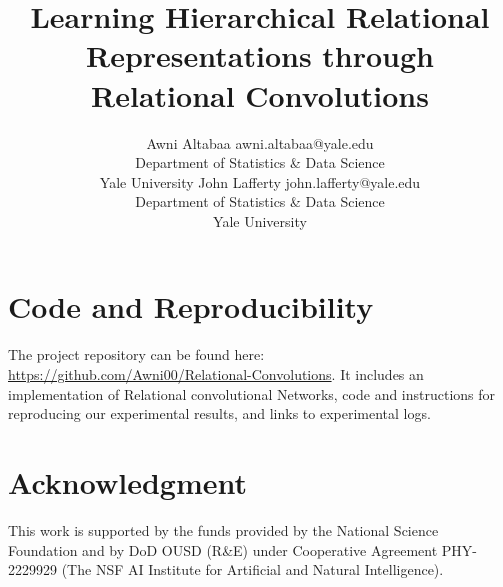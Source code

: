 \documentclass[10pt]{article}
\title{Learning Hierarchical Relational Representations through \\ Relational Convolutions}
\author{\name Awni Altabaa \email awni.altabaa@yale.edu \\
      \addr Department of Statistics \& Data Science\\
      Yale University
      \AND
      \name John Lafferty \email john.lafferty@yale.edu \\
      \addr Department of Statistics \& Data Science\\
      Yale University
    }
\begin{document}
\maketitle









% 





\section*{Code and Reproducibility}
The project repository can be found here: \url{https://github.com/Awni00/Relational-Convolutions}. It includes an implementation of Relational convolutional Networks, code and instructions for reproducing our experimental results, and links to experimental logs.

\section*{Acknowledgment}
This work is supported by the funds provided by the National Science Foundation and by DoD OUSD (R\&E) under Cooperative Agreement PHY-2229929 (The NSF AI Institute for Artificial and Natural Intelligence).

\printbibliography
% 
% 
% 
% 

\clearpage
\newpage
\appendix


\clearpage\newpage

\clearpage\newpage

\clearpage\newpage

\end{document}
